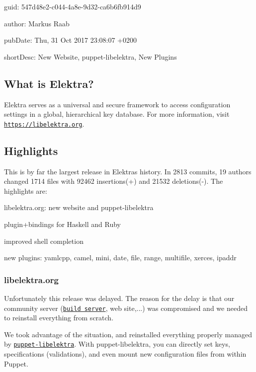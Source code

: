 
\begin{DoxyItemize}
\item guid\+: 547d48e2-\/c044-\/4a8e-\/9d32-\/ca6b6fb914d9
\item author\+: Markus Raab
\item pub\+Date\+: Thu, 31 Oct 2017 23\+:08\+:07 +0200
\item short\+Desc\+: New Website, puppet-\/libelektra, New Plugins
\end{DoxyItemize}

\subsection*{What is Elektra?}

Elektra serves as a universal and secure framework to access configuration settings in a global, hierarchical key database. For more information, visit \href{https://libelektra.org}{\tt https\+://libelektra.\+org}.

\subsection*{Highlights}

This is by far the largest release in Elektra\textquotesingle{}s history. In 2813 commits, 19 authors changed 1714 files with 92462 insertions(+) and 21532 deletions(-\/). The highlights are\+:


\begin{DoxyItemize}
\item libelektra.\+org\+: new website and puppet-\/libelektra
\item plugin+bindings for Haskell and Ruby
\item improved shell completion
\item new plugins\+: yamlcpp, camel, mini, date, file, range, multifile, xerces, ipaddr
\end{DoxyItemize}

\subsubsection*{libelektra.\+org}

Unfortunately this release was delayed. The reason for the delay is that our community server (\href{https://build.libelektra.org}{\tt build server}, web site,...) was compromised and we needed to reinstall everything from scratch.

We took advantage of the situation, and reinstalled everything properly managed by \href{https://github.com/ElektraInitiative/puppet-libelektra}{\tt puppet-\/libelektra}. With puppet-\/libelektra, you can directly set keys, specifications (validations), and even mount new configuration files from within Puppet.

